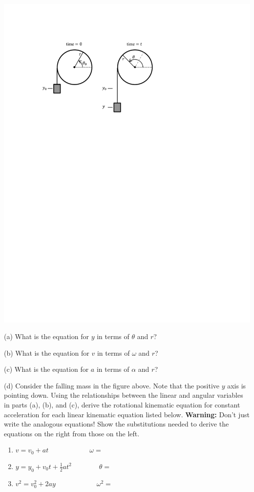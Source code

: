 \vspace{0.3cm}
{\par\centering \includegraphics[scale=0.9]{rotation/rotation_fig9_new.pdf} \par}
\vspace{0.3cm}

(a) What is the equation for $y$ in terms of \( \theta  \) and $r$?
\vspace{7mm}

(b) What is the equation for $v$ in terms of \( \omega  \) and $r$?
\vspace{7mm}

(c) What is the equation for $a$ in terms of \( \alpha  \) and $r$?
\vspace{7mm}

(d) Consider the falling mass in the figure above. Note that the positive 
$y$ axis is pointing down. Using the 
relationships between the linear and angular variables in parts (a), (b), and 
(c), derive the rotational kinematic equation for constant acceleration for 
each linear kinematic equation listed below. \textbf{Warning:} Don't just write
the analogous equations! Show the substitutions needed to derive the equations
on the right from those on the left.

\begin{enumerate}
\item \( v=v_{0}+at\qquad \qquad \qquad \omega = \)
\vspace{20mm}

\item \( y=y_{0}+v_{0}t+\frac{1}{2}at^{2}\qquad \qquad \theta = \)
\vspace{20mm}

\item \( v^{2}=v_{0}^{2}+2ay\qquad \qquad \qquad \omega ^{2}= \)
\end{enumerate}

